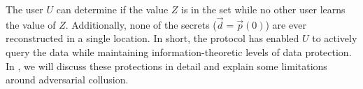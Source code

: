 The user $U$ can determine if the value $Z$
is in the set while no other user learns the value of $Z$. Additionally,
none of the secrets ($\vec{d}=\vec{p}(0)$) are ever reconstructed in a
single location. 
In short, the \SIF protocol has
enabled $U$ to actively query the data while maintaining
information-theoretic levels of data
protection. In , we will discuss these
protections in detail and explain some limitations around adversarial
collusion.
